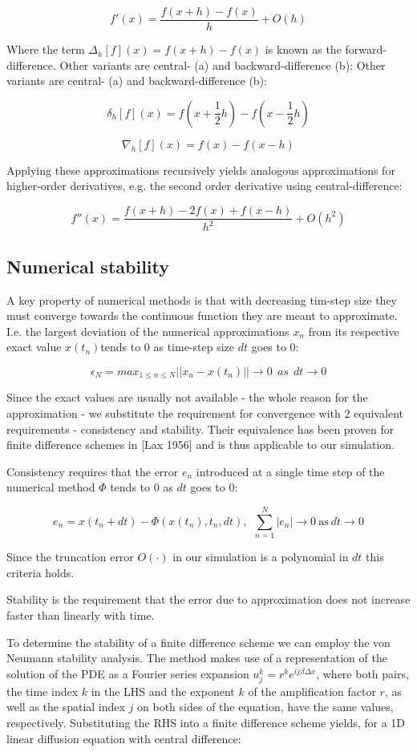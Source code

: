 \documentclass[12pt]{article}
\begin{document}
$$f'(x)=\frac{f(x+h)-f(x)}{h}+O(h)$$

Where the term $\Delta_h[f](x)=f(x+h)-f(x)$ is known as the forward-difference. Other variants are central- (a) and backward-difference (b): Other variants are central- (a) and backward-difference (b):

$$\delta_h[f](x)=f(x+\frac{1}{2}h)-f(x-\frac{1}{2}h)$$

$$\nabla_h[f](x) = f(x)-f(x-h)$$

Applying these approximations recursively yields analogous approximations for higher-order derivatives, e.g. the second order derivative using central-difference:

$$f''(x)=\frac{f(x+h)-2f(x)+f(x-h)}{h^2}+O(h^2)$$


\subsection{Numerical stability}

A key property of numerical methods is that with decreasing tim-step size they must converge towards the continuous function they are meant to approximate. I.e. the largest deviation of the numerical approximations $x_n$ from its respective exact value $x(t_n)$tends to 0 as time-step size $dt$ goes to 0:

$$\epsilon_N=max_{1\le n\le N}||x_n-x(t_n)||\to0\ \ as\ \ dt\to 0$$

Since the exact values are usually not available - the whole reason for the approximation - we substitute the requirement for convergence with 2 equivalent requirements - consistency and stability. Their equivalence has been proven for finite difference schemes in [Lax 1956] and is thus applicable to our simulation.

Consistency requires that the error $e_n$ introduced at a single time step of the numerical method $\Phi$ tends to 0 as $dt$ goes to 0:

$$e_n = x(t_n+dt) - \Phi(x(t_n),t_n,dt),\ \ \sum_{n=1}^N|e_n|\to 0\ \mathrm{as}\ dt\to 0$$

 Since the truncation error $O(\cdot)$ in our simulation is a polynomial in $dt$ this criteria holds.

 
 Stability is the requirement that the error due to approximation does not increase faster than linearly with time. 

To determine the stability of a finite difference scheme we can employ the von Neumann stability analysis. The method makes use of a representation of the solution of the PDE as a Fourier series expansion $u_j^k=r^ke^{ij\beta \Delta x}$, where both pairs, the time index $k$ in the LHS and the exponent $k$ of the amplification factor $r$, as well as the spatial index $j$ on both sides of the equation, have the same values, respectively. Substituting the RHS into a finite difference scheme yields, for a 1D linear diffusion equation with central difference:
\end{document}
